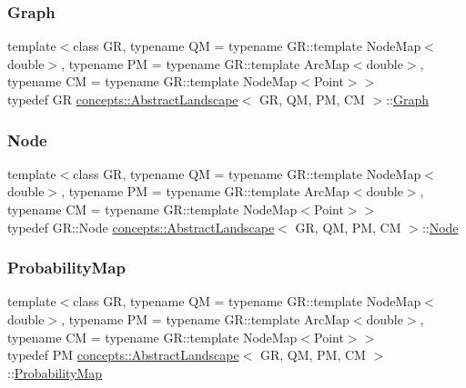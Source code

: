 \subsubsection{\texorpdfstring{Graph}{Graph}}
{\footnotesize\ttfamily template$<$class GR, typename QM = typename G\+R\+::template Node\+Map$<$double$>$, typename PM = typename G\+R\+::template Arc\+Map$<$double$>$, typename CM = typename G\+R\+::template Node\+Map$<$\+Point$>$$>$ \\
typedef GR \hyperlink{classconcepts_1_1_abstract_landscape}{concepts\+::\+Abstract\+Landscape}$<$ GR, QM, PM, CM $>$\+::\hyperlink{classconcepts_1_1_abstract_landscape_ab1988ca4ff36329c45af21e76046903d}{Graph}}

\mbox{\label{classconcepts_1_1_abstract_landscape_a7c2f90fb9f42302f1af84a59f4df4b91}} 
\subsubsection{\texorpdfstring{Node}{Node}}
{\footnotesize\ttfamily template$<$class GR, typename QM = typename G\+R\+::template Node\+Map$<$double$>$, typename PM = typename G\+R\+::template Arc\+Map$<$double$>$, typename CM = typename G\+R\+::template Node\+Map$<$\+Point$>$$>$ \\
typedef G\+R\+::\+Node \hyperlink{classconcepts_1_1_abstract_landscape}{concepts\+::\+Abstract\+Landscape}$<$ GR, QM, PM, CM $>$\+::\hyperlink{classconcepts_1_1_abstract_landscape_a7c2f90fb9f42302f1af84a59f4df4b91}{Node}}

\mbox{\label{classconcepts_1_1_abstract_landscape_ae90ffb759facff21b29e646539352182}} 
\subsubsection{\texorpdfstring{Probability\+Map}{ProbabilityMap}}
{\footnotesize\ttfamily template$<$class GR, typename QM = typename G\+R\+::template Node\+Map$<$double$>$, typename PM = typename G\+R\+::template Arc\+Map$<$double$>$, typename CM = typename G\+R\+::template Node\+Map$<$\+Point$>$$>$ \\
typedef PM \hyperlink{classconcepts_1_1_abstract_landscape}{concepts\+::\+Abstract\+Landscape}$<$ GR, QM, PM, CM $>$\+::\hyperlink{classconcepts_1_1_abstract_landscape_ae90ffb759facff21b29e646539352182}{Probability\+Map}}

